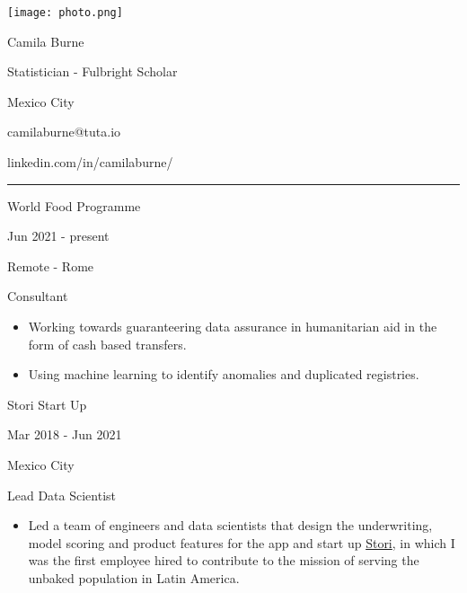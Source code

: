 \documentclass[a4paper,10pt]{article}
\newlength{\cvcolumngapwidth}
\newlength{\cvleftcolumnwidth}
\newlength{\cvrightcolumnwidth}
\newcommand{\cvnamestyle}[1]{{\Large\cvnamefont\textcolor{cvnamecolor}{#1}}}
\newcommand{\cvsectionstyle}[1]{{\normalsize\cvsectionfont\textcolor{cvsectioncolor}{#1}}}
\newcommand{\cvtitlestyle}[1]{{\large\cvtitlefont\textcolor{cvtitlecolor}{#1}}}
\newcommand{\cvdurationstyle}[1]{{\small\cvdurationfont\textcolor{cvdurationcolor}{#1}}}
\newcommand{\cvheadingstyle}[1]{{\normalsize\cvheadingfont\textcolor{cvheadingcolor}{#1}}}
\newlength{\cvafteritemskipamount}
\newlength{\cvaftersectionskipamount}
\newlength{\cvafternameskipamount}
\newlength{\cvafterpersonalinfolineskipamount}
\newlength{\cvaftertitleskipamount}
\newlength{\cvparskip}
\newcommand{\cvpersonalinfo}[2]{
    \begin{minipage}[t]{\cvleftcolumnwidth}
        \vspace{0mm} %
        \raggedleft #1
    \end{minipage}%
    \hspace{\cvcolumngapwidth}%
    \begin{minipage}[t]{\cvrightcolumnwidth}
        \vspace{0mm} %
        #2
    \end{minipage}

    \vspace{\cvafteritemskipamount}
}
\newcommand{\cvname}[1]{
    \cvnamestyle{#1}

    \vspace{\cvafternameskipamount}
}
\newcommand{\cvpersonalinfolinewithicon}[3]{
    \raisebox{.5\fontcharht\font`E-.5\height}{\texttt{[image: \#2]}}
    #3

    \vspace{\cvafterpersonalinfolineskipamount}
}
\newcommand{\cvsection}[1]{
    \begin{minipage}[t]{\cvleftcolumnwidth}
        \raggedleft\cvsectionstyle{#1}
    \end{minipage}%
    \hspace{\cvcolumngapwidth}%
    \begin{minipage}[t]{\cvrightcolumnwidth}
        \textcolor{cvrulecolor}{\rule{\cvrightcolumnwidth}{0.3mm}}
    \end{minipage}

    \vspace{\cvaftersectionskipamount}
}
\newcommand{\cvitem}[2]{
    \begin{minipage}[t]{\cvleftcolumnwidth}
        \raggedleft #1
    \end{minipage}%
    \hspace{\cvcolumngapwidth}%
    \begin{minipage}[t]{\cvrightcolumnwidth}
        \setlength{\parskip}{\cvparskip} #2
    \end{minipage}

    \vspace{\cvafteritemskipamount}
}
\newcommand{\cvtitle}[1]{
    \cvtitlestyle{#1}

    \vspace{\cvaftertitleskipamount}
    \vspace{-\cvparskip}
}
\begin{document}

\cvpersonalinfo{
    \texttt{[image: photo.png]}
}{
    \cvname{Camila Burne}
    \cvtitle{Statistician - Fulbright Scholar}
    \cvdurationstyle{}

    \cvpersonalinfolinewithicon{height=4mm}{072-location.pdf}{
        Mexico City
    }


    \cvpersonalinfolinewithicon{height=4mm}{070-envelop.pdf}{
        camilaburne@tuta.io
    }

    \cvpersonalinfolinewithicon{height=4mm}{458-linkedin.pdf}{
        linkedin.com/in/camilaburne/
    }

}




\cvsection{WORK EXPERIENCE}

\cvitem{
    \cvheadingstyle{World Food Programme}

    \cvdurationstyle{Jun 2021 - present}

    \cvdurationstyle{Remote - Rome}


}{
    \cvtitle{Consultant}

    \begin{itemize}[leftmargin=*]
    \item Working towards guaranteering data assurance in humanitarian aid in the form of cash based transfers.
    \item Using machine learning to identify anomalies and duplicated registries.
    \end{itemize}
}


\cvitem{
    \cvheadingstyle{Stori Start Up}

    \cvdurationstyle{Mar 2018 - Jun 2021}

    \cvdurationstyle{Mexico City}


}{
    \cvtitle{Lead Data Scientist}


    \begin{itemize}[leftmargin=*]
        \item Led a team of engineers and data scientists that design the underwriting, model scoring and product features for the app and start up \href{https://www.storicard.com/nosotros}{Stori}, in which I was the first employee hired to contribute to the mission of serving the unbaked population in Latin America.
    \end{itemize}
}
\end{document}
